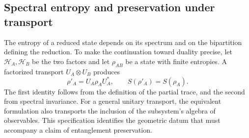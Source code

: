 \subsection{Spectral entropy and preservation under transport}
\label{v:ant:sec:biparticion-transporte}

The entropy of a reduced state depends on its spectrum and on the
bipartition defining the reduction. To make the continuation
toward duality precise, let \(\mathcal H_A,\mathcal H_B\) be the two factors
and let \(\rho_{AB}\) be a state with finite entropies. A factorized
transport \(U_A\otimes U_B\) produces
\[
 \rho'_A=U_A\rho_AU_A^*,\qquad S(\rho'_A)=S(\rho_A).
\]
The first identity follows from the definition of the partial trace, and the
second from spectral invariance. For a general unitary transport,
the equivalent formulation also transports
the inclusion of the subsystem's algebra of observables. This specification
identifies the geometric datum that must accompany a claim
of entanglement preservation.
